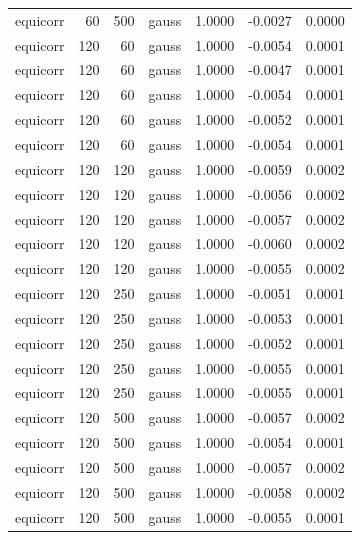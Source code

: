 \begin{tabular}{lrrlrrr}
equicorr & 60 & 500 & gauss & 1.0000 & -0.0027 & 0.0000 \\
equicorr & 120 & 60 & gauss & 1.0000 & -0.0054 & 0.0001 \\
equicorr & 120 & 60 & gauss & 1.0000 & -0.0047 & 0.0001 \\
equicorr & 120 & 60 & gauss & 1.0000 & -0.0054 & 0.0001 \\
equicorr & 120 & 60 & gauss & 1.0000 & -0.0052 & 0.0001 \\
equicorr & 120 & 60 & gauss & 1.0000 & -0.0054 & 0.0001 \\
equicorr & 120 & 120 & gauss & 1.0000 & -0.0059 & 0.0002 \\
equicorr & 120 & 120 & gauss & 1.0000 & -0.0056 & 0.0002 \\
equicorr & 120 & 120 & gauss & 1.0000 & -0.0057 & 0.0002 \\
equicorr & 120 & 120 & gauss & 1.0000 & -0.0060 & 0.0002 \\
equicorr & 120 & 120 & gauss & 1.0000 & -0.0055 & 0.0002 \\
equicorr & 120 & 250 & gauss & 1.0000 & -0.0051 & 0.0001 \\
equicorr & 120 & 250 & gauss & 1.0000 & -0.0053 & 0.0001 \\
equicorr & 120 & 250 & gauss & 1.0000 & -0.0052 & 0.0001 \\
equicorr & 120 & 250 & gauss & 1.0000 & -0.0055 & 0.0001 \\
equicorr & 120 & 250 & gauss & 1.0000 & -0.0055 & 0.0001 \\
equicorr & 120 & 500 & gauss & 1.0000 & -0.0057 & 0.0002 \\
equicorr & 120 & 500 & gauss & 1.0000 & -0.0054 & 0.0001 \\
equicorr & 120 & 500 & gauss & 1.0000 & -0.0057 & 0.0002 \\
equicorr & 120 & 500 & gauss & 1.0000 & -0.0058 & 0.0002 \\
equicorr & 120 & 500 & gauss & 1.0000 & -0.0055 & 0.0001 \\
\bottomrule
\end{tabular}
